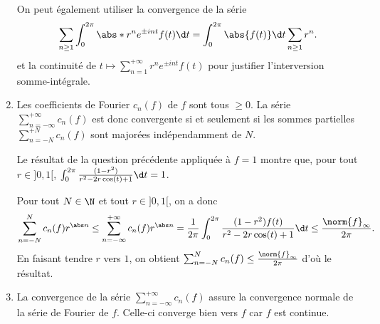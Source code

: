 \begin{enonce}
\begin{solution}
\begin{enumerate}
On peut également utiliser la convergence de la série
\begin{equation*}
\sum_{n\geq 1} \int_0^{2\pi} \abs*{r^n e^{\pm int} f(t)} \d t
=
\int_0^{2\pi} \abs{f(t)} \d t \sum_{n\geq 1} r^n.
\end{equation*}
et la continuité de $t\mapsto\sum_{n=1}^{+\infty} r^n e^{\pm int}f(t)$ pour justifier l'interversion somme-intégrale.

\item 
Les coefficients de Fourier $c_n(f)$ de $f$ sont tous $\geq 0$.
La série $\sum_{n=-\infty}^{+\infty} c_n(f)$ est donc convergente si et seulement si les sommes partielles $\sum_{n=-N}^{+N} c_n(f)$ sont majorées indépendamment de $N$.

Le résultat de la question précédente appliquée à $f=1$ montre que, pour tout $r\in]0,1[$, $\int_0^{2\pi}  \frac{(1-r^2)}{r^2-2r\cos(t)+1}\d t=1$.


Pour tout $N\in\N$ et tout $r\in]0,1[$, on a donc
\begin{equation*}
\sum_{n=-N}^N c_n(f) r^{\abs n}
\leq
\sum_{n=-\infty}^{+\infty} c_n(f) r^{\abs n}
=
\frac1{2\pi}\int_0^{2\pi} \frac{(1-r^2)f(t)}{r^2-2r\cos(t)+1}\d t
\leq
\frac{\norm{f}_\infty}{2\pi}.
\end{equation*}
En faisant tendre $r$ vers $1$, on obtient $\sum_{n=-N}^N c_n(f) \leq \frac{\norm{f}_\infty}{2\pi}$ d'où le résultat.

\item La convergence de la série $\sum_{n=-\infty}^{+\infty} c_n(f)$ assure la convergence normale de la série de Fourier de $f$. Celle-ci converge bien vers $f$ car $f$ est continue. %
\end{enumerate}
\end{solution}
\end{enonce}
